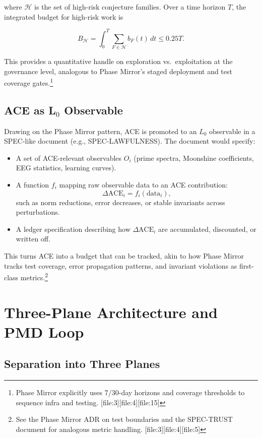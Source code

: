 \documentclass[11pt]{article}
\begin{document}
where \(\mathcal{H}\) is the set of high-risk conjecture families. Over a time horizon \(T\), the integrated budget for high-risk work is

\[
B_\mathcal{H} = \int_0^T \sum_{F\in \mathcal{H}} b_F(t)\, dt \le 0.25 T.
\]

This provides a quantitative handle on exploration vs.\ exploitation at the governance level, analogous to Phase Mirror's staged deployment and test coverage gates.\footnote{Phase Mirror explicitly uses 7/30-day horizons and coverage thresholds to sequence infra and testing. [file:3][file:4][file:15]}

\subsection{ACE as L\texorpdfstring{\(_0\)}{} Observable}

Drawing on the Phase Mirror pattern, ACE is promoted to an \(L_0\) observable in a SPEC-like document (e.g., SPEC-LAWFULNESS). The document would specify:

\begin{itemize}[leftmargin=*]
  \item A set of ACE-relevant observables \(O_i\) (prime spectra, Moonshine coefficients, EEG statistics, learning curves).
  \item A function \(f_i\) mapping raw observable data to an ACE contribution:
  \[
  \Delta \mathrm{ACE}_i = f_i(\text{data}_i),
  \]
  such as norm reductions, error decreases, or stable invariants across perturbations.
  \item A ledger specification describing how \(\Delta \mathrm{ACE}_i\) are accumulated, discounted, or written off.
\end{itemize}

This turns ACE into a budget that can be tracked, akin to how Phase Mirror tracks test coverage, error propagation patterns, and invariant violations as first-class metrics.\footnote{See the Phase Mirror ADR on test boundaries and the SPEC-TRUST document for analogous metric handling. [file:3][file:4][file:5]}

\newpage

\section{Three-Plane Architecture and PMD Loop}

\subsection{Separation into Three Planes}
\end{document}
